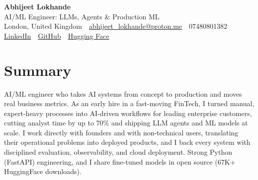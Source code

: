 \documentclass[10pt,a4paper]{article}
\newcommand{\sep}{\,\textcolor{accent!60}{\textbar}\,}
\begin{document}
\begin{center}
  {\fontsize{24}{26}\selectfont\bfseries Abhijeet Lokhande}\\[3pt]
  {\color{accent}\large AI/ML Engineer: LLMs, Agents \& Production ML}\\[5pt]
  {\small
    London, United Kingdom \sep
    \href{mailto:abhijeet_lokhande@proton.me}{abhijeet\_lokhande@proton.me} \sep
    07480801382 \\[2pt]
    \href{https://www.linkedin.com/in/ablds/}{LinkedIn} \sep
    \href{https://github.com/abhijeetscode}{GitHub} \sep
    \href{https://huggingface.co/ab-ai}{Hugging Face}
  }
\end{center}
\vspace{2pt}

\section{Summary}
AI/ML engineer who takes AI systems from concept to production and moves real business metrics. As an early hire in a fast-moving FinTech, I turned manual, expert-heavy processes into AI-driven workflows for leading enterprise customers, cutting analyst time by up to 70\% and shipping LLM agents and ML models at scale. I work directly with founders and with non-technical users, translating their operational problems into deployed products, and I back every system with disciplined evaluation, observability, and cloud deployment. Strong Python (FastAPI) engineering, and I share fine-tuned models in open source (67K+ HuggingFace downloads).

\end{document}

